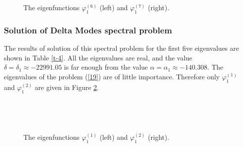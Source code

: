 \documentclass[authoryear]{elsarticle}
\begin{document}
\begin{figure}[htp]
  \begin{center}
\begin{minipage}{0.49\linewidth}
 \\
\end{minipage}
\hfill
\begin{minipage}{0.49\linewidth}
 \\
\end{minipage}
\caption{The eigenfunctions $\varphi^{(6)}_1$ (left) and $\varphi^{(7)}_1$ (right).}
\label{fig:10}
  \end{center}
\end{figure}

\subsubsection{Solution of Delta  Modes spectral problem} 
The results of solution of this spectral problem for the first five eigenvalues are shown in Table \ref{t-4}. All the eigenvalues are real, and the value $\delta = \delta_1 \approx -22991.05$ is far enough from the value $\alpha  = \alpha_1 \approx -140.308$.
The eigenvalues of the problem (\ref{19}) are of little importance. Therefore only $\varphi^{(1)}_1$ and $\varphi^{(2)}_1$ are given in Figure \ref{fig:11}.

\begin{figure}[htp]
  \begin{center}
\begin{minipage}{0.49\linewidth}
 \\
\end{minipage}
\hfill
\begin{minipage}{0.49\linewidth}
 \\
\end{minipage}
\caption{The eigenfunctions $\varphi^{(1)}_1$ (left) and $\varphi^{(2)}_1$ (right).}
\label{fig:11}
  \end{center}
\end{figure}
\end{document}
